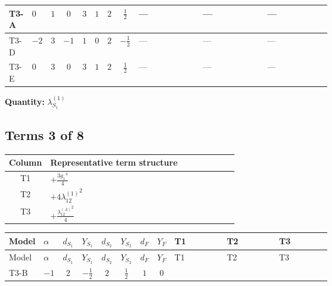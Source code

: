 \documentclass[8pt]{article}
\begin{document}
\begin{landscape}
\begin{longtable}{@{}llcccccc >{\raggedright\arraybackslash}p{0.21\linewidth} >{\raggedright\arraybackslash}p{0.21\linewidth} >{\raggedright\arraybackslash}p{0.21\linewidth}@{}}
\midrule
T3-A & $0$ & $1$ & $0$ & $3$ & $1$ & $2$ & $\frac{1}{2}$ & --- & --- & --- \\
\midrule
T3-D & $-2$ & $3$ & $-1$ & $1$ & $0$ & $2$ & $-\frac{1}{2}$ & --- & --- & --- \\
\midrule
T3-E & $0$ & $3$ & $0$ & $3$ & $1$ & $2$ & $\frac{1}{2}$ & --- & --- & --- \\
\midrule
\bottomrule
\end{longtable}
\clearpage
\noindent\textbf{Quantity: }$\lambda_{S_1}^{(1)}$\par\smallskip
\subsection*{Terms 3 of 8}
\begin{center}
\begin{tabular}{@{}c >{\raggedright\arraybackslash}p{0.82\linewidth}@{}}
\toprule
Column & Representative term structure \\
\midrule
T1 & \(\displaystyle +\frac{3 {g_1}^4}{4}\) \\
\midrule
T2 & \(\displaystyle +4 {\lambda_{12}^{(1)}}^2\) \\
\midrule
T3 & \(\displaystyle +\frac{{\lambda_{12}^{(A)}}^2}{4}\) \\
\midrule
\bottomrule
\end{tabular}
\end{center}
\smallskip
\tiny
\begin{longtable}{@{}llcccccc >{\raggedright\arraybackslash}p{0.21\linewidth} >{\raggedright\arraybackslash}p{0.21\linewidth} >{\raggedright\arraybackslash}p{0.21\linewidth}@{}}
\toprule
Model & $\alpha$ & $d_{S_1}$ & $Y_{S_1}$ & $d_{S_2}$ & $Y_{S_2}$ & $d_F$ & $Y_F$ & T1 & T2 & T3 \\
\midrule
\endfirsthead
\toprule
Model & $\alpha$ & $d_{S_1}$ & $Y_{S_1}$ & $d_{S_2}$ & $Y_{S_2}$ & $d_F$ & $Y_F$ & T1 & T2 & T3 \\
\midrule
\endhead
T3-B & $-1$ & $2$ & $-\frac{1}{2}$ & $2$ & $\frac{1}{2}$ & $1$ & $0$ & \scriptsize\adjustbox{max width=\linewidth}{$\begin{gathered} +\frac{3 {g_1}^4}{4}\end{gathered}$} & \scriptsize\adjustbox{max width=\linewidth}{$\begin{gathered} +4 {\lambda_{12}^{(1)}}^2\end{gathered}$} & \scriptsize\adjustbox{max width=\linewidth}{$\begin{gathered} +\frac{{\lambda_{12}^{(A)}}^2}{4}\end{gathered}$} \\

\end{longtable}
\end{landscape}
\end{document}
